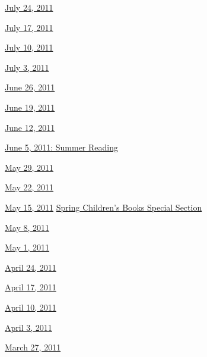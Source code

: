 \href{http://www.nytimes3xbfgragh.onion/indexes/2011/07/23/books/review/index.html}{July
24, 2011}

\href{http://www.nytimes3xbfgragh.onion/indexes/2011/07/16/books/review/index.html}{July
17, 2011}

\href{http://www.nytimes3xbfgragh.onion/indexes/2011/07/09/books/review/index.html}{July
10, 2011}

\href{http://www.nytimes3xbfgragh.onion/indexes/2011/07/02/books/review/index.html}{July
3, 2011}

\href{http://www.nytimes3xbfgragh.onion/indexes/2011/06/25/books/review/index.html}{June
26, 2011}

\href{http://www.nytimes3xbfgragh.onion/indexes/2011/06/18/books/review/index.html}{June
19, 2011}

\href{http://www.nytimes3xbfgragh.onion/indexes/2011/06/11/books/review/index.html}{June
12, 2011}

\href{http://www.nytimes3xbfgragh.onion/indexes/2011/06/04/books/review/index.html}{June
5, 2011: Summer Reading}

\href{http://www.nytimes3xbfgragh.onion/indexes/2011/05/28/books/review/index.html}{May
29, 2011}

\href{http://www.nytimes3xbfgragh.onion/indexes/2011/05/21/books/review/index.html}{May
22, 2011}

\href{http://www.nytimes3xbfgragh.onion/indexes/2011/05/14/books/review/index.html}{May
15, 2011} \textbar{}
\href{http://www.nytimes3xbfgragh.onion/indexes/2011/05/13/arts/artsspecial/index.html}{Spring
Children's Books Special Section}

\href{http://www.nytimes3xbfgragh.onion/indexes/2011/05/07/books/review/index.html}{May
8, 2011}

\href{http://www.nytimes3xbfgragh.onion/indexes/2011/04/30/books/review/index.html}{May
1, 2011}

\href{http://www.nytimes3xbfgragh.onion/indexes/2011/04/23/books/review/index.html}{April
24, 2011}

\href{http://www.nytimes3xbfgragh.onion/indexes/2011/04/16/books/review/index.html}{April
17, 2011}

\href{http://www.nytimes3xbfgragh.onion/indexes/2011/04/09/books/review/index.html}{April
10, 2011}

\href{http://www.nytimes3xbfgragh.onion/indexes/2011/04/02/books/review/index.html}{April
3, 2011}

\href{http://www.nytimes3xbfgragh.onion/indexes/2011/03/26/books/review/index.html}{March
27, 2011}

